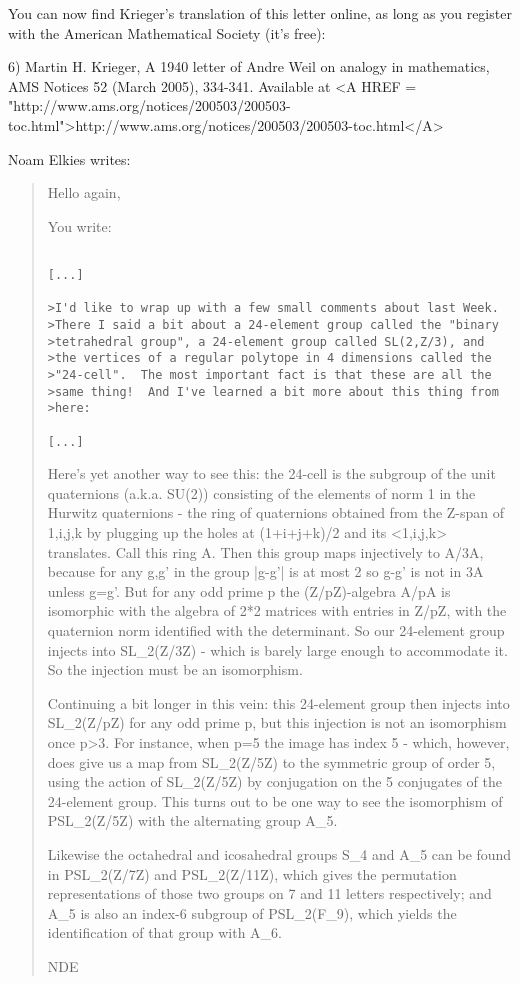You can now find Krieger's translation of this letter 
online, as long as you register with the American
Mathematical Society (it's free):

6) Martin H. Krieger, A 1940 letter of Andre Weil on analogy
in mathematics, AMS Notices 52 (March 2005), 334-341.  Available
at <A HREF = "http://www.ams.org/notices/200503/200503-toc.html">http://www.ams.org/notices/200503/200503-toc.html</A>


Noam Elkies writes:

\begin{quote}
Hello again,

You write:

\begin{verbatim}

[...]

>I'd like to wrap up with a few small comments about last Week.
>There I said a bit about a 24-element group called the "binary 
>tetrahedral group", a 24-element group called SL(2,Z/3), and 
>the vertices of a regular polytope in 4 dimensions called the 
>"24-cell".  The most important fact is that these are all the 
>same thing!  And I've learned a bit more about this thing from 
>here:

[...]
\end{verbatim}
    

Here's yet another way to see this: the 24-cell is the subgroup
of the unit quaternions (a.k.a. SU(2)) consisting of the elements
of norm 1 in the Hurwitz quaternions - the ring of quaternions
obtained from the Z-span of {1,i,j,k} by plugging up the holes
at (1+i+j+k)/2 and its <1,i,j,k> translates.  Call this ring A.
Then this group maps injectively to A/3A, because for any g,g'
in the group |g-g'| is at most 2 so g-g' is not in 3A unless g=g'.
But for any odd prime p the (Z/pZ)-algebra A/pA is isomorphic
with the algebra of 2*2 matrices with entries in Z/pZ,
with the quaternion norm identified with the determinant.
So our 24-element group injects into SL_{2}(Z/3Z) - which is
barely large enough to accommodate it.  So the injection
must be an isomorphism.

Continuing a bit longer in this vein: this 24-element group
then injects into SL_{2}(Z/pZ) for any odd prime p, but this injection
is not an isomorphism once p>3.  For instance, when p=5 the image
has index 5 - which, however, does give us a map from SL_{2}(Z/5Z)
to the symmetric group of order 5, using the action of SL_{2}(Z/5Z)
by conjugation on the 5 conjugates of the 24-element group.
This turns out to be one way to see the isomorphism of PSL_{2}(Z/5Z)
with the alternating group A_{5}.

Likewise the octahedral and icosahedral groups S_{4} 
and A_{5}
can be found in PSL_{2}(Z/7Z) and PSL_{2}(Z/11Z), which gives
the permutation representations of those two groups on
7 and 11 letters respectively; and A_{5} is also an index-6 subgroup
of PSL_{2}(F_{9}), which yields the identification of 
that group with A_{6}.

NDE
\end{quote}

